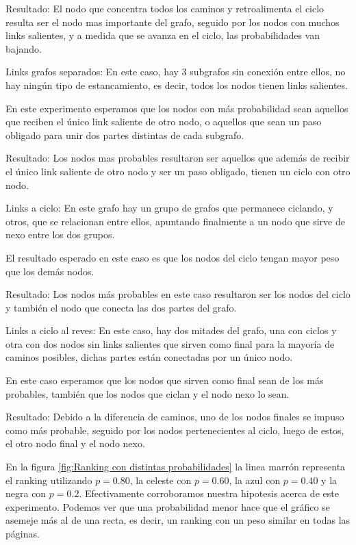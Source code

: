 Resultado: El nodo que concentra todos los caminos y retroalimenta el ciclo resulta ser el nodo mas importante del grafo, seguido por los nodos con muchos links salientes, y a medida que se avanza en el ciclo, las probabilidades van bajando.

Links grafos separados: En este caso, hay 3 subgrafos sin conexi\'on entre ellos, no hay ning\'un tipo de estancamiento, es decir, todos los nodos tienen links salientes.

En este experimento esperamos que los nodos con m\'as probabilidad sean aquellos que reciben el \'unico link saliente de otro nodo, o aquellos que sean un paso obligado para unir dos partes distintas de cada subgrafo.

Resultado: Los nodos mas probables resultaron ser aquellos que adem\'as de recibir el \'unico link saliente de otro nodo y ser un paso obligado, tienen un ciclo con otro nodo.

Links a ciclo: En este grafo hay un grupo de grafos que permanece ciclando, y otros, que se relacionan entre ellos, apuntando finalmente a un nodo que sirve de nexo entre los dos grupos.

El resultado esperado en este caso es que los nodos del ciclo tengan mayor peso que los dem\'as nodos.

Resultado: Los nodos m\'as probables en este caso resultaron ser los nodos del ciclo y tambi\'en el nodo que conecta las dos partes del grafo.

Links a ciclo al reves: En este caso, hay dos mitades del grafo, una con ciclos y otra con dos nodos sin links salientes que sirven como final para la mayor\'ia de caminos posibles, dichas partes est\'an conectadas por un \'unico nodo.

En este caso esperamos que los nodos que sirven como final sean de los m\'as probables, tambi\'en que los nodos que ciclan y el nodo nexo lo sean.

Resultado: Debido a la diferencia de caminos, uno de los nodos finales se impuso como m\'as probable, seguido por los nodos pertenecientes al ciclo, luego de estos, el otro nodo final y el nodo nexo.

En la figura \ref{fig:Ranking con distintas probabilidades} la linea marrón representa el ranking utilizando $p = 0.80$, la celeste con $p = 0.60$, la azul con $p = 0.40 $ y la negra con $p = 0.2$. Efectivamente corroboramos nuestra hipotesis acerca de este experimento. Podemos ver que una probabilidad menor hace que el gr\'afico se asemeje m\'as al de una recta, es decir, un ranking con un peso similar en todas las p\'aginas.



